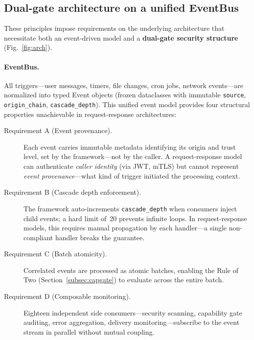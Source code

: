 \documentclass[pdflatex,sn-nature]{sn-jnl}%
\theoremstyle{thmstyleone}%
\theoremstyle{thmstyletwo}%
\theoremstyle{thmstylethree}%
\begin{document}
\subsection{Dual-gate architecture on a unified EventBus}\label{subsec:dualgate}

These principles impose requirements on the underlying architecture that necessitate both an event-driven model and a \textbf{dual-gate security structure} (Fig.~\ref{fig:arch}).

\paragraph{EventBus.} All triggers---user messages, timers, file changes, cron jobs, network events---are normalized into typed Event objects (frozen dataclasses with immutable \texttt{source}, \texttt{origin\_chain}, \texttt{cascade\_depth}). This unified event model provides four structural properties unachievable in request-response architectures:

\begin{description}
  \item[Requirement A (Event provenance).] Each event carries immutable metadata identifying its origin and trust level, set by the framework---not by the caller. A request-response model can authenticate \emph{caller identity} (via JWT, mTLS) but cannot represent \emph{event provenance}---what kind of trigger initiated the processing context.
  \item[Requirement B (Cascade depth enforcement).] The framework auto-increments \texttt{cascade\_depth} when consumers inject child events; a hard limit of~20 prevents infinite loops. In request-response models, this requires manual propagation by each handler---a single non-compliant handler breaks the guarantee.
  \item[Requirement C (Batch atomicity).] Correlated events are processed as atomic batches, enabling the Rule of Two (Section~\ref{subsec:capgate}) to evaluate across the entire batch.
  \item[Requirement D (Composable monitoring).] Eighteen independent side consumers---security scanning, capability gate auditing, error aggregation, delivery monitoring---subscribe to the event stream in parallel without mutual coupling.
\end{description}
\end{document}
